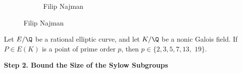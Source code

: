 \begin{frame}[plain]
\begin{figure}[h]
\begin{subfigure}{0.3\textwidth}
	\caption{Filip Najman}
	\end{subfigure}
	\end{figure}
\end{frame}





\begin{frame}[plain]
\begin{prop}
Let $E/\Q$ be a rational elliptic curve, and let $K/\Q$ be a nonic Galois field. If $P \in E(K)$ is a point of prime order $p$, then $p \in \{ 2, 3, 5, 7, 13,$ $19 \}$.
\end{prop}
\end{frame}





\begin{frame}[plain]
\vfill
\begin{center} {\bfseries \Large \textcolor{UniGray}{Step 2. Bound the Size of the Sylow Subgroups}} \end{center}
\vfill 
\end{frame}





